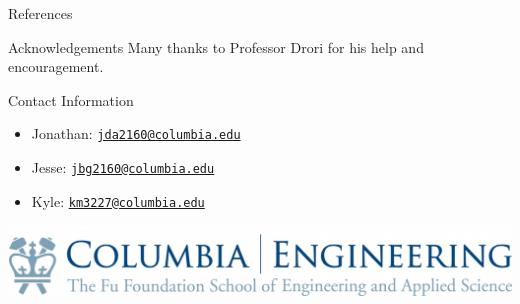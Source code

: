 \documentclass[final]{beamer}
\newlength{\onecolwid}
\begin{document}
\begin{frame}[t]
\begin{columns}[t]
\begin{column}{\onecolwid}
\begin{block}{References}
	
	
	   
	
	
%
%
\end{block}

\begin{block}{Acknowledgements}
Many thanks to Professor Drori for his help and encouragement. \\
\end{block}


\begin{alertblock}{Contact Information}
\begin{itemize}
\item Jonathan: \href{mailto:jda2160@columbia.edu}{\texttt{jda2160@columbia.edu}}
\item Jesse: \href{mailto:jbg2160@columbia.edu}{\texttt{jbg2160@columbia.edu}}
\item Kyle: \href{mailto:km3227@columbia.edu}{\texttt{km3227@columbia.edu}}
\end{itemize}
\end{alertblock}

\begin{center}
\includegraphics[width=0.8\linewidth]{logo.jpg} %
\end{center}

\end{column} %
\end{columns} %
\end{frame} %
\end{document}
